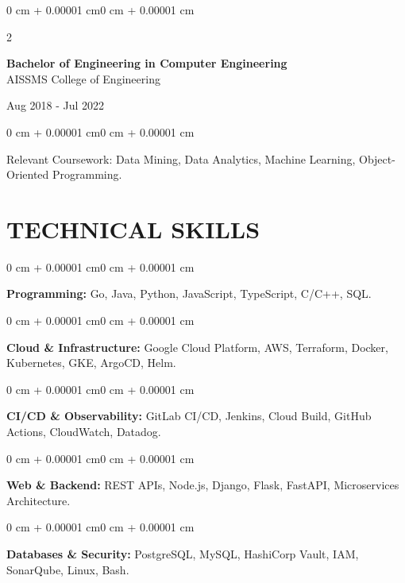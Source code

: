 \documentclass[10pt, letterpaper]{article}
\newenvironment{onecolentry}{
    \begin{adjustwidth}{0 cm + 0.00001 cm}{0 cm + 0.00001 cm}
}{
    \end{adjustwidth}
}
\newenvironment{twocolentry}[2][]{
    \onecolentry
    \def\secondColumn{#2}
    \setcolumnwidth{\fill, 4.5 cm}
    \begin{paracol}{2}
}{
    \switchcolumn \raggedleft \secondColumn
    \end{paracol}
    \endonecolentry
}
\begin{document}
\begin{twocolentry}{
    Aug 2018 - Jul 2022
}
    \textbf{Bachelor of Engineering in Computer Engineering} \\
    AISSMS College of Engineering
\end{twocolentry}
\begin{onecolentry}
Relevant Coursework: Data Mining, Data Analytics, Machine Learning, Object-Oriented Programming.
\end{onecolentry}
\section{TECHNICAL SKILLS}
\begin{onecolentry}
\textbf{Programming:} Go, Java, Python, JavaScript, TypeScript, C/C++, SQL.
\end{onecolentry}
\vspace{0.06 cm}
\begin{onecolentry}
\textbf{Cloud \& Infrastructure:} Google Cloud Platform, AWS, Terraform, Docker, Kubernetes, GKE, ArgoCD, Helm.
\end{onecolentry}
\vspace{0.06 cm}
\begin{onecolentry}
\textbf{CI/CD \& Observability:} GitLab CI/CD, Jenkins, Cloud Build, GitHub Actions, CloudWatch, Datadog.
\end{onecolentry}
\vspace{0.06 cm}
\begin{onecolentry}
\textbf{Web \& Backend:} REST APIs, Node.js, Django, Flask, FastAPI, Microservices Architecture.
\end{onecolentry}
\vspace{0.06 cm}
\begin{onecolentry}
\textbf{Databases \& Security:} PostgreSQL, MySQL, HashiCorp Vault, IAM, SonarQube, Linux, Bash.
\end{onecolentry}

\end{document}
